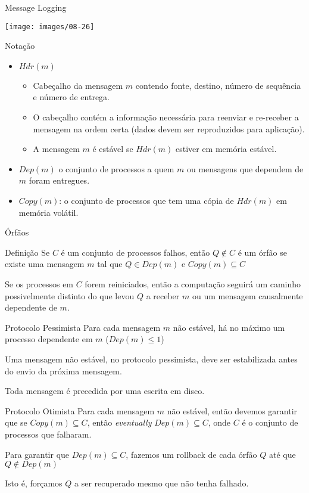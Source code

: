 \begin{frame}{Message Logging}
	
	
	\texttt{[image: images/08-26]}
\end{frame}

\begin{frame}{Notação}
	\begin{itemize}
		\item $Hdr(m)$
		\begin{itemize}
			\item Cabeçalho da mensagem $m$ contendo fonte, destino, número de sequência e número de entrega.
			\item O cabeçalho contém a informação necessária para reenviar e re-receber a mensagem na ordem certa (dados devem ser reproduzidos para aplicação).
			\item A mensagem $m$ é estável se $Hdr(m)$ estiver em memória estável.
		\end{itemize}
		\item $Dep(m)$ o conjunto de processos a quem $m$ ou mensagens que dependem de $m$ foram entregues.
		\item $Copy(m)$: o conjunto de processos que tem uma cópia de $Hdr(m)$ em memória volátil.
	\end{itemize}
\end{frame}

\begin{frame}{Órfãos}
	\begin{block}{Definição}
		Se $C$ é um conjunto de processos falhos, então $Q\not\in C$ é um órfão se existe uma mensagem $m$ tal que $Q \in Dep(m)$ e $Copy(m)\subseteq C$	
	\end{block}
	
	Se os processos em $C$ forem reiniciados, então a computação seguirá um caminho possivelmente distinto do que levou $Q$ a receber $m$ ou um mensagem causalmente dependente de $m$.

\end{frame}


\begin{frame}{Protocolo Pessimista}
	Para cada mensagem $m$ não estável, há no máximo um processo dependente em $m$ ($Dep(m) \leq 1$)
	
	\pause 
	Uma mensagem não estável, no protocolo pessimista, deve ser estabilizada antes do envio da próxima mensagem.
	
	\pause
	Toda mensagem é precedida por uma escrita em disco.
\end{frame}

\begin{frame}{Protocolo Otimista}
	Para cada mensagem $m$ não estável, então devemos garantir que se $Copy(m) \subseteq C$, então \emph{eventually} $Dep(m) \subseteq C$, onde $C$ é o conjunto de processos que falharam.
	
	\pause 
	Para garantir que $Dep(m) \subseteq C$, fazemos um rollback de cada órfão $Q$ até que $Q \not\in Dep(m)$
	
	\pause Isto é, forçamos $Q$ a ser recuperado mesmo que não tenha falhado.
\end{frame}

